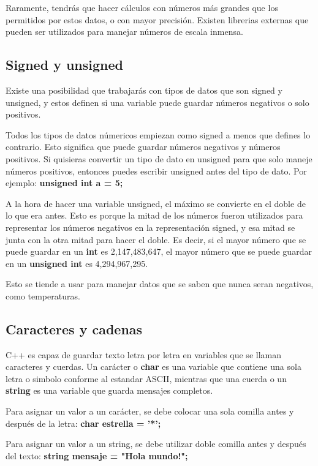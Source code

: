 \documentclass{article}
\begin{document}
Raramente, tendrás que hacer cálculos con números más grandes que los permitidos por estos datos, o con mayor precisión. Existen librerias externas que pueden ser utilizados para manejar números de escala inmensa.

\subsection{Signed y unsigned}

Existe una posibilidad que trabajarás con tipos de datos que son signed y unsigned, y estos definen si una variable puede guardar números negativos o solo positivos.

Todos los tipos de datos númericos empiezan como signed a menos que defines lo contrario. Esto significa que puede guardar números negativos y números positivos. Si quisieras convertir un tipo de dato en unsigned para que solo maneje números positivos, entonces puedes escribir unsigned antes del tipo de dato. Por ejemplo: \textbf{unsigned int a = 5;}

A la hora de hacer una variable unsigned, el máximo se convierte en el doble de lo que era antes. Esto es porque la mitad de los números fueron utilizados para representar los números negativos en la representación signed, y esa mitad se junta con la otra mitad para hacer el doble. Es decir, si el mayor número que se puede guardar en un \textbf{int} es 2,147,483,647, el mayor número que se puede guardar en un \textbf{unsigned int} es 4,294,967,295.

Esto se tiende a usar para manejar datos que se saben que nunca seran negativos, como temperaturas.

\subsection{Caracteres y cadenas}

C++ es capaz de guardar texto letra por letra en variables que se llaman caracteres y cuerdas. Un carácter o \textbf{char} es una variable que contiene una sola letra o simbolo conforme al estandar ASCII, mientras que una cuerda o un \textbf{string} es una variable que guarda mensajes completos.

Para asignar un valor a un carácter, se debe colocar una sola comilla antes y después de la letra: \textbf{char estrella = '*';}

Para asignar un valor a un string, se debe utilizar doble comilla antes y después del texto: \textbf{string mensaje = "Hola mundo!";}
\end{document}
